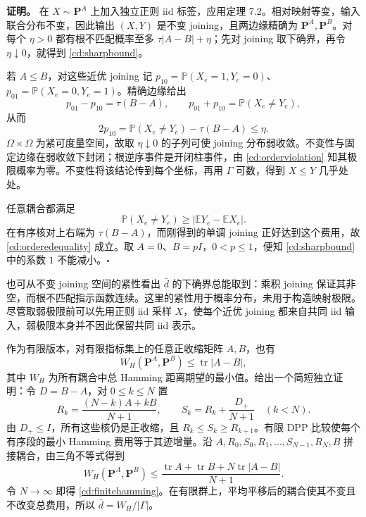 \documentclass[UTF8,zihao=-4,a4paper]{ctexart}
\numberwithin{equation}{section}
\begin{document}
\textbf{证明。}
在 $X\sim\mathbf P^A$ 上加入独立正则 iid 标签，应用定理 7.2。相对映射等变，输入联合分布不变，因此输出 $(X,Y)$ 是不变 joining，且两边缘精确为 $\mathbf P^A,\mathbf P^B$。对每个 $\eta>0$ 都有根不匹配概率至多 $\tau|A-B|+\eta$；先对 joining 取下确界，再令 $\eta\downarrow0$，就得到 \eqref{cd:sharpbound}。

若 $A\le B$，对这些近优 joining 记
$p_{10}=\mathbb P(X_e=1,Y_e=0)$、$p_{01}=\mathbb P(X_e=0,Y_e=1)$。精确边缘给出
\[
p_{01}-p_{10}=\tau(B-A),\qquad
p_{01}+p_{10}=\mathbb P(X_e\ne Y_e),
\]
从而
\begin{equation}
2p_{10}=\mathbb P(X_e\ne Y_e)-\tau(B-A)\le\eta.
\label{cd:orderviolation}
\end{equation}
$\Omega\times\Omega$ 为紧可度量空间，故取 $\eta\downarrow0$ 的子列可使 joining 分布弱收敛。不变性与固定边缘在弱收敛下封闭；根逆序事件是开闭柱事件，由 \eqref{cd:orderviolation} 知其极限概率为零。不变性将该结论传到每个坐标，再用 $\Gamma$ 可数，得到 $X\le Y$ 几乎处处。

任意耦合都满足
\[
\mathbb P(X_e\ne Y_e)\ge
|\mathbb EY_e-\mathbb EX_e|.
\]
在有序核对上右端为 $\tau(B-A)$，而刚得到的单调 joining 正好达到这个费用，故 \eqref{cd:orderedequality} 成立。取 $A=0$、$B=pI$，$0<p\le1$，便知 \eqref{cd:sharpbound} 中的系数 $1$ 不能减小。\hfill$\square$

也可从不变 joining 空间的紧性看出 $\bar d$ 的下确界总能取到：乘积 joining 保证其非空，而根不匹配指示函数连续。这里的紧性用于概率分布，未用于构造映射极限。尽管取弱极限前可以先用正则 iid 采样 $X$，使每个近优 joining 都来自共同 iid 输入，弱极限本身并不因此保留共同 iid 表示。

作为有限版本，对有限指标集上的任意正收缩矩阵 $A,B$，也有
\begin{equation}
W_H(\mathbf P^A,\mathbf P^B)\le\operatorname{tr}|A-B|,
\label{cd:finitehamming}
\end{equation}
其中 $W_H$ 为所有耦合中总 Hamming 距离期望的最小值。给出一个简短独立证明：令 $D=B-A$，对 $0\le k\le N$ 置
\[
R_k=\frac{(N-k)A+kB}{N+1},\qquad
S_k=R_k+\frac{D_+}{N+1}\quad(k<N).
\]
由 $D_+\le I$，所有这些核仍是正收缩，且
$R_k\le S_k\ge R_{k+1}$。有限 DPP 比较使每个有序段的最小 Hamming 费用等于其迹增量。沿
$A,R_0,S_0,R_1,\ldots,S_{N-1},R_N,B$
拼接耦合，由三角不等式得到
\[
W_H(\mathbf P^A,\mathbf P^B)
\le\frac{\operatorname{tr}A+\operatorname{tr}B+
                      N\operatorname{tr}|A-B|}{N+1}.
\]
令 $N\to\infty$ 即得 \eqref{cd:finitehamming}。在有限群上，平均平移后的耦合使其不变且不改变总费用，所以
$\bar d=W_H/|\Gamma|$。
\end{document}
